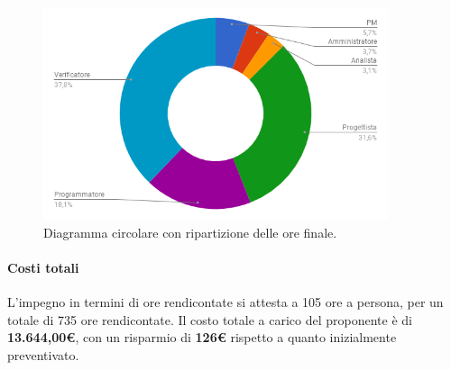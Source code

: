 \begin{figure}[H] 
	\centering 
	\includegraphics[width=0.9\textwidth]{images/CircolareFinaleRendicontate.png} 
	\caption{Diagramma circolare con ripartizione delle ore finale.}
	\label{CircolareFinaleRendicontate}
\end{figure}

\paragraph{Costi totali} \Spazio
L’impegno in termini di ore rendicontate si attesta a 105 ore a persona, per un totale di 735 ore rendicontate.
Il costo totale a carico del proponente è di \textbf{13.644,00\euro}, con un risparmio di \textbf{126\euro} rispetto a quanto inizialmente preventivato.
